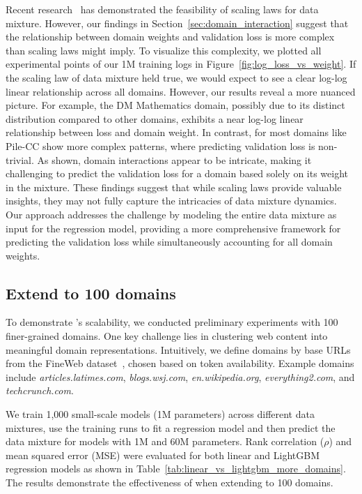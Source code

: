 Recent research~\citep{ye2024datamixing,ge2024data} has demonstrated the feasibility of scaling laws for data mixture.
However, our findings in Section~\ref{sec:domain_interaction} suggest that the relationship between domain weights and validation loss is more complex than scaling laws might imply.
To visualize this complexity, we plotted all experimental points of our 1M training logs in Figure~\ref{fig:log_loss_vs_weight}.
If the scaling law of data mixture held true, we would expect to see a clear log-log linear relationship across all domains.
However, our results reveal a more nuanced picture.
For example, the DM Mathematics domain, possibly due to its distinct distribution compared to other domains, exhibits a near log-log linear relationship between loss and domain weight.
In contrast, for most domains like Pile-CC show more complex patterns, where predicting validation loss is non-trivial.
As shown, domain interactions appear to be intricate, making it challenging to predict the validation loss for a domain based solely on its weight in the mixture.
These findings suggest that while scaling laws provide valuable insights, they may not fully capture the intricacies of data mixture dynamics.
Our approach addresses the challenge by modeling the entire data mixture as input for the regression model, providing a more comprehensive framework for predicting the validation loss while simultaneously accounting for all domain weights.



\subsection{Extend \ourmethod to 100 domains}

To demonstrate \ourmethod's scalability, we conducted preliminary experiments with 100 finer-grained domains. 
One key challenge lies in clustering web content into meaningful domain representations.
Intuitively, we define domains by base URLs from the FineWeb dataset~\citep{penedo2024fineweb}, chosen based on token availability. 
Example domains include \textit{articles.latimes.com}, \textit{blogs.wsj.com}, \textit{en.wikipedia.org}, \textit{everything2.com}, and \textit{techcrunch.com}. 

We train 1,000 small-scale models (1M parameters) across different data mixtures, use the training runs to fit a regression model and then predict the data mixture for models with 1M and 60M parameters. 
Rank correlation ($\rho$) and mean squared error (MSE) were evaluated for both linear and LightGBM regression models as shown in Table~\ref{tab:linear_vs_lightgbm_more_domains}.
The results demonstrate the effectiveness of \ourmethod when extending to 100 domains.


